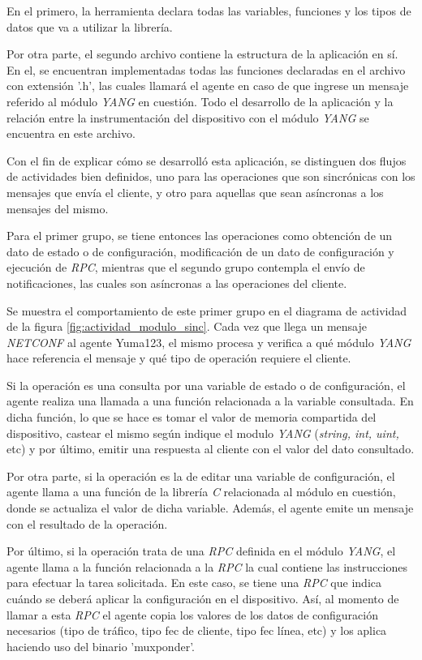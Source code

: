   En el primero, la herramienta declara todas las variables, funciones y los tipos de datos que va a utilizar la librería. 

  Por otra parte, el segundo archivo contiene la estructura de la aplicación en sí. En el, se encuentran implementadas todas las funciones declaradas en el archivo con extensión '.h', las cuales llamará el agente en caso de que ingrese un mensaje referido al módulo \textit{YANG} en cuestión. Todo el desarrollo de la aplicación y la relación entre la instrumentación del dispositivo con el módulo \textit{YANG} se encuentra en este archivo. 


  Con el fin de explicar cómo se desarrolló esta aplicación, se distinguen dos flujos de actividades bien definidos, uno para las operaciones que son sincrónicas con los mensajes que envía el cliente, y otro para aquellas que sean asíncronas a los mensajes del mismo. 

  Para el primer grupo, se tiene entonces las operaciones como obtención de un dato de estado o de configuración, modificación de un dato de configuración y ejecución de \textit{RPC}, mientras que el segundo grupo contempla el envío de notificaciones, las cuales son asíncronas a las operaciones del cliente.
  

  Se muestra el comportamiento de este primer grupo en el diagrama de actividad de la figura \ref{fig:actividad_modulo_sinc}. Cada vez que llega un mensaje \textit{NETCONF} al agente Yuma123, el mismo procesa y verifica a qué módulo \textit{YANG} hace referencia el mensaje y qué tipo de operación requiere el cliente. 

  Si la operación es una consulta por una variable de estado o de configuración, el agente realiza una llamada a una función relacionada a la variable consultada. En dicha función, lo que se hace es tomar el valor de memoria compartida del dispositivo, castear el mismo según indique el modulo \textit{YANG} (\textit{string, int, uint,} etc) y por último, emitir una respuesta al cliente con el valor del dato consultado.

  Por otra parte, si la operación es la de editar una variable de configuración, el agente llama a una función de la librería \textit{C} relacionada al módulo en cuestión, donde se actualiza el valor de dicha variable. Además, el agente emite un mensaje con el resultado de la operación. 

  Por último, si la operación trata de una \textit{RPC} definida en el módulo \textit{YANG}, el agente llama a la función relacionada a la \textit{RPC} la cual contiene las instrucciones para efectuar la tarea solicitada. En este caso, se tiene una \textit{RPC} que indica cuándo se deberá aplicar la configuración en el dispositivo. Así, al momento de llamar a esta \textit{RPC} el agente copia los valores de los datos de configuración necesarios (tipo de tráfico, tipo fec de cliente, tipo fec línea, etc) y los aplica haciendo uso del binario 'muxponder'.

